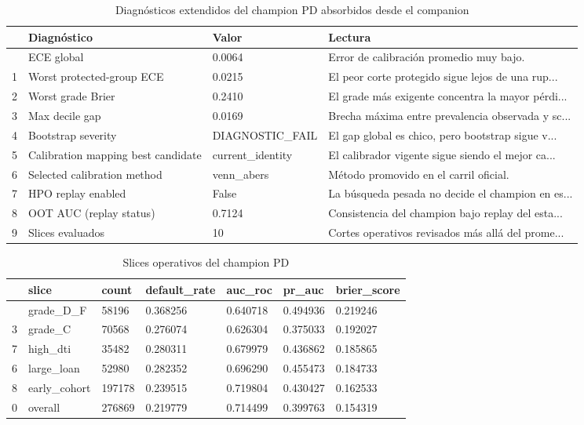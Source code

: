 \documentclass[
  spanish,
  11pt,
  letterpaper,
]{scrbook}
\theoremstyle{plain}
\theoremstyle{remark}
\begin{document}
{

\begin{longtable}[]{@{}llll@{}}

\caption{\label{tbl-champion-diagnostic-extensions}Diagnósticos
extendidos del champion PD absorbidos desde el companion}

\tabularnewline

\toprule\noalign{}
& Diagnóstico & Valor & Lectura \\
\midrule\noalign{}
\endhead
\bottomrule\noalign{}
\endlastfoot
0 & ECE global & 0.0064 & Error de calibración promedio muy bajo. \\
1 & Worst protected-group ECE & 0.0215 & El peor corte protegido sigue
lejos de una rup... \\
2 & Worst grade Brier & 0.2410 & El grade más exigente concentra la
mayor pérdi... \\
3 & Max decile gap & 0.0169 & Brecha máxima entre prevalencia observada
y sc... \\
4 & Bootstrap severity & DIAGNOSTIC\_FAIL & El gap global es chico, pero
bootstrap sigue v... \\
5 & Calibration mapping best candidate & current\_identity & El
calibrador vigente sigue siendo el mejor ca... \\
6 & Selected calibration method & venn\_abers & Método promovido en el
carril oficial. \\
7 & HPO replay enabled & False & La búsqueda pesada no decide el
champion en es... \\
8 & OOT AUC (replay status) & 0.7124 & Consistencia del champion bajo
replay del esta... \\
9 & Slices evaluados & 10 & Cortes operativos revisados más allá del
prome... \\

\end{longtable}

}

{

\begin{longtable}[]{@{}lllllll@{}}

\caption{\label{tbl-champion-slice-performance}Slices operativos del
champion PD}

\tabularnewline

\toprule\noalign{}
& slice & count & default\_rate & auc\_roc & pr\_auc & brier\_score \\
\midrule\noalign{}
\endhead
\bottomrule\noalign{}
\endlastfoot
4 & grade\_D\_F & 58196 & 0.368256 & 0.640718 & 0.494936 & 0.219246 \\
3 & grade\_C & 70568 & 0.276074 & 0.626304 & 0.375033 & 0.192027 \\
7 & high\_dti & 35482 & 0.280311 & 0.679979 & 0.436862 & 0.185865 \\
6 & large\_loan & 52980 & 0.282352 & 0.696290 & 0.455473 & 0.184733 \\
8 & early\_cohort & 197178 & 0.239515 & 0.719804 & 0.430427 &
0.162533 \\
0 & overall & 276869 & 0.219779 & 0.714499 & 0.399763 & 0.154319 \\

\end{longtable}

}
\end{document}
